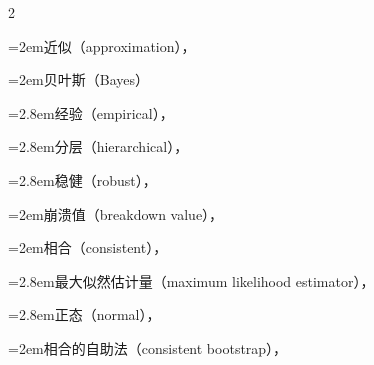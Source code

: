 \begin{multicols}{2}
\par\noindent\hangindent=2em\hspace*{1em}\label{idx:764}近似（approximation），\hyperref[eq:5.5.9]{\pageref*{eq:5.5.9}}\par
{}
\par\noindent\hangindent=2em\hspace*{1em}\label{idx:765}贝叶斯（Bayes）\par
\par\noindent\hangindent=2.8em\hspace*{1.8em}\label{idx:766}经验（empirical），\hyperref[idxocc:766:331]{\pageref*{idxocc:766:331}}\par
\par\noindent\hangindent=2.8em\hspace*{1.8em}\label{idx:767}分层（hierarchical），\hyperref[idxocc:767:332]{\pageref*{idxocc:767:332}}\par
\par\noindent\hangindent=2.8em\hspace*{1.8em}\label{idx:768}稳健（robust），\hyperref[idxocc:768:331]{\pageref*{idxocc:768:331}}\par
\par\noindent\hangindent=2em\hspace*{1em}\label{idx:769}崩溃值（breakdown value），\hyperref[def:10.2.2]{\pageref*{def:10.2.2}}\par
\par\noindent\hangindent=2em\hspace*{1em}\label{idx:770}相合（consistent），\hyperref[def:10.1.1]{\pageref*{def:10.1.1}}\par
\par\noindent\hangindent=2.8em\hspace*{1.8em}\label{idx:771}最大似然估计量（maximum likelihood estimator），\hyperref[thm:10.1.6]{\pageref*{thm:10.1.6}}\par
\par\noindent\hangindent=2.8em\hspace*{1.8em}\label{idx:772}正态（normal），\hyperref[ex:10.1.2]{\pageref*{ex:10.1.2}}\par
\par\noindent\hangindent=2em\hspace*{1em}\label{idx:773}相合的自助法（consistent bootstrap），\hyperref[item:10.1.bootstrap.b]{\pageref*{item:10.1.bootstrap.b}}\par

\end{multicols}
